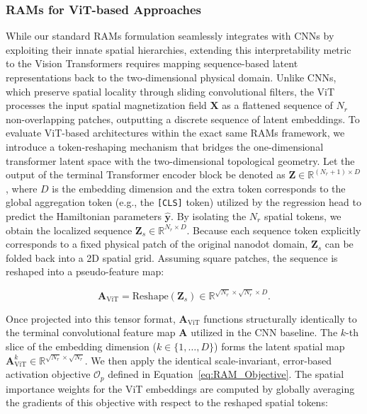 \documentclass[a4paper,fleqn]{cas-sc}
\begin{document}
\subsubsection{RAMs for ViT-based Approaches}\label{sec:ViT_RAMs}
While our standard RAMs formulation seamlessly integrates with CNNs by exploiting their innate spatial hierarchies, extending this interpretability metric to the Vision Transformers requires mapping sequence-based latent representations back to the two-dimensional physical domain. Unlike CNNs, which preserve spatial locality through sliding convolutional filters, the ViT processes the input spatial magnetization field $\mathbf{X}$ as a flattened sequence of $N_r$ non-overlapping patches, outputting a discrete sequence of latent embeddings. To evaluate ViT-based architectures within the exact same RAMs framework, we introduce a token-reshaping mechanism that bridges the one-dimensional transformer latent space with the two-dimensional topological geometry. Let the output of the terminal Transformer encoder block be denoted as $\mathbf{Z} \in \mathbb{R}^{(N_r + 1) \times D}$, where $D$ is the embedding dimension and the extra token corresponds to the global aggregation token (e.g., the \texttt{[CLS]} token) utilized by the regression head to predict the Hamiltonian parameters $\hat{\mathbf{y}}$. By isolating the $N_r$ spatial tokens, we obtain the localized sequence $\mathbf{Z}_s \in \mathbb{R}^{N_r \times D}$. Because each sequence token explicitly corresponds to a fixed physical patch of the original nanodot domain, $\mathbf{Z}_s$ can be folded back into a 2D spatial grid. Assuming square patches, the sequence is reshaped into a pseudo-feature map:

\begin{equation}\label{eq:ViT_Reshape}
\mathbf{A}_{\text{ViT}} = \text{Reshape}(\mathbf{Z}_s) \in \mathbb{R}^{\sqrt{N_r} \times \sqrt{N_r} \times D}.
\end{equation}

Once projected into this tensor format, $\mathbf{A}_{\text{ViT}}$ functions structurally identically to the terminal convolutional feature map $\mathbf{A}$ utilized in the CNN baseline. The $k$-th slice of the embedding dimension ($k \in \{1, \dots, D\}$) forms the latent spatial map $\mathbf{A}_{\text{ViT}}^k \in \mathbb{R}^{\sqrt{N_r} \times \sqrt{N_r}}$. We then apply the identical scale-invariant, error-based activation objective $\mathcal{O}_p$ defined in Equation~\ref{eq:RAM_Objective}. The spatial importance weights for the ViT embeddings are computed by globally averaging the gradients of this objective with respect to the reshaped spatial tokens:
\end{document}
